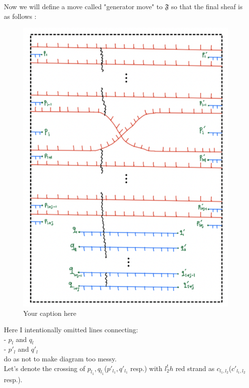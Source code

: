 Now we will define a move called "generator move" to $\mathfrak{F}$ so that the final sheaf is as follows :\\
\begin{figure}[H] %
    \centering
    \includegraphics[width=\linewidth]{diagrams/theorem12/2.png} %
    \caption{Your caption here}
    \label{fig:your-label}
\end{figure}



Here I intentionally omitted lines connecting:\\
- $p_l$ and $q_l$\\
- $p'_l$ and $q'_l$\\

do as not to make diagram too messy.\\

Let's denote the crossing of $p_{l_1},q_{l_1}$($p'_{l_1},q'_{l_1}$ resp.) with $l_2^th$ red strand as $c_{l_1,l_2}$($c'_{l_1,l_2}$ resp.).\\

